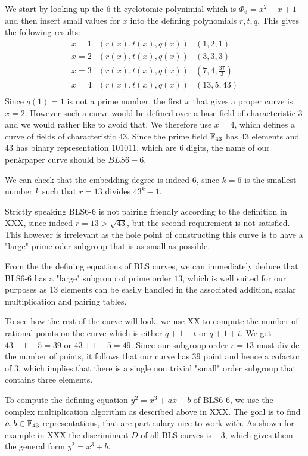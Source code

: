 We start by looking-up the $6$-th cyclotomic polynimial which is $\Phi_{6}=x^2-x+1$ and then insert small values for $x$ into the defining polynomials $r,t,q$. This gives the following results:
$$
\begin{array}{lcr}
x=1 & (r(x),t(x),q(x)) & (1,2,1)\\
x=2 & (r(x),t(x),q(x)) & (3,3,3)\\
x=3 & (r(x),t(x),q(x)) & (7,4,\frac{37}{3})\\
x=4 & (r(x),t(x),q(x)) & (13,5,43)\\
\end{array}
$$
Since $q(1)=1$ is not a prime number, the first $x$ that gives a proper curve is $x=2$. However such a curve would be defined over a base field of characteristic $3$ and we would rather like to avoid that. We therefore use $x=4$, which defines a curve of fields of characteristic $43$. Since the prime field $\mathbb{F}_{43}$ has $43$ elements and $43$ has binary representation $101011$, which are $6$ digits, the name of our pen\&{}paper curve should be $BLS6-6$.

We can check that the embedding degree is indeed $6$, since $k= 6$ is the smallest number $k$ such that $r=13$ divides $43^k-1$. 

Strictly speaking BLS6-6 is not pairing friendly according to the definition in XXX, since indeed $r=13 > \sqrt{43}$, but the second requirement is not satisfied. This however is irrelevant as the hole point of constructing this curve is to have a "large" prime oder subgroup that is as small as possible. 

From the the defining equations of BLS curves, we can immediately deduce that BLS6-6 has a "large" subgroup of prime order $13$, which is well suited for our purposes as $13$ elements can be easily handled in the associated addition, scalar multiplication and pairing tables. 

To see how the rest of the curve will look, we use XX to compute the number of rational points on the curve which is either $q+1-t$ or $q+1+t$. We get $43+1-5= 39$ or $43+1+5=49$. Since our subgroup order $r=13$ must divide the number of points, it follows that our curve has $39$ point and hence a cofactor of $3$, which implies that there is a single non trivial "small" order subgroup that contains three elements.

To compute the defining equation $y^2=x^3 + ax +b$ of BLS6-6, we use the complex multiplication algorithm as described above in XXX. The goal is to find $a,b\in\mathbb{F}_{43}$ representations, that are particulary nice to work with. As shown for example in XXX the discriminant $D$ of all BLS curves is $-3$, which gives them the general form $y^2 = x^3 +b$.

